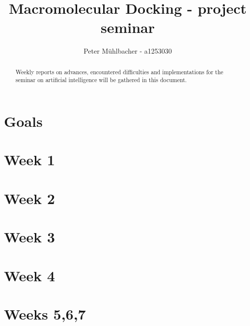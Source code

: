 \documentclass[12pt]{article}
\title{Macromolecular Docking - project seminar}
\author{Peter M\"uhlbacher - a1253030}
\theoremstyle{definition}\newtheorem*{definition}{Definition}
\theoremstyle{definition}\newtheorem*{remark}{Remark}
\begin{document}
\maketitle
\tableofcontents

\begin{abstract}
Weekly reports on advances, encountered difficulties and implementations for the seminar on artificial intelligence will be gathered in this document.
\end{abstract}

\section*{Goals}


\section{Week 1}


\section{Week 2}


\section{Week 3}


\section{Week 4}


\section{Weeks 5,6,7}




\end{document}
